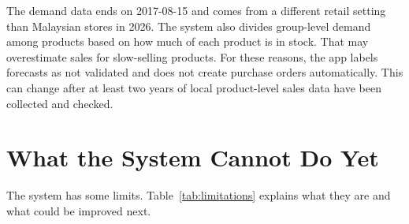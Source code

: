 \documentclass[12pt,a4paper]{article}
\renewcommand{\_}{\oldunderscore\allowbreak}
\begin{document}
\begin{auditnote}
The demand data ends on 2017-08-15 and comes from a different retail setting than Malaysian stores in 2026. The system also divides group-level demand among products based on how much of each product is in stock. That may overestimate sales for slow-selling products. For these reasons, the app labels forecasts as not validated and does not create purchase orders automatically. This can change after at least two years of local product-level sales data have been collected and checked.
\end{auditnote}

\section{What the System Cannot Do Yet}

The system has some limits. Table~\ref{tab:limitations} explains what they are and what could be improved next.
\end{document}
